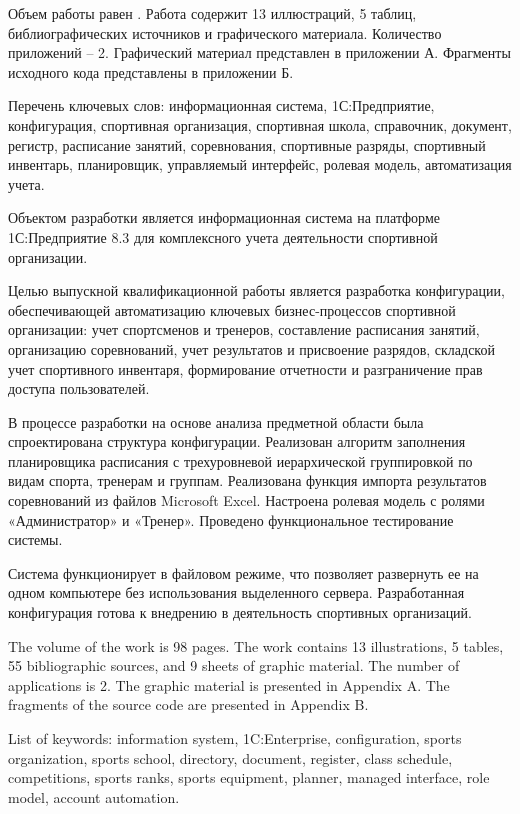 
Объем работы равен . Работа содержит 13 иллюстраций, 5 таблиц,  библиографических источников и  графического материала. Количество приложений – 2. Графический материал представлен в приложении А. Фрагменты исходного кода представлены в приложении Б.

Перечень ключевых слов: информационная система, 1С:Предприятие, конфигурация, спортивная организация, спортивная школа, справочник, документ, регистр, расписание занятий, соревнования, спортивные разряды, спортивный инвентарь, планировщик, управляемый интерфейс, ролевая модель, автоматизация учета.

Объектом разработки является информационная система на платформе 1С:Предприятие 8.3 для комплексного учета деятельности спортивной организации.

Целью выпускной квалификационной работы является разработка конфигурации, обеспечивающей автоматизацию ключевых бизнес-процессов спортивной организации: учет спортсменов и тренеров, составление расписания занятий, организацию соревнований, учет результатов и присвоение разрядов, складской учет спортивного инвентаря, формирование отчетности и разграничение прав доступа пользователей.

В процессе разработки на основе анализа предметной области была спроектирована структура конфигурации. Реализован алгоритм заполнения планировщика расписания с трехуровневой иерархической группировкой по видам спорта, тренерам и группам. Реализована функция импорта результатов соревнований из файлов Microsoft Excel. Настроена ролевая модель с ролями «Администратор» и «Тренер». Проведено функциональное тестирование системы.

Система функционирует в файловом режиме, что позволяет развернуть ее на одном компьютере без использования выделенного сервера. Разработанная конфигурация готова к внедрению в деятельность спортивных организаций.


The volume of the work is 98 pages. The work contains 13 illustrations, 5 tables, 55 bibliographic sources, and 9 sheets of graphic material. The number of applications is 2. The graphic material is presented in Appendix A. The fragments of the source code are presented in Appendix B.

List of keywords: information system, 1C:Enterprise, configuration, sports organization, sports school, directory, document, register, class schedule, competitions, sports ranks, sports equipment, planner, managed interface, role model, account automation.

